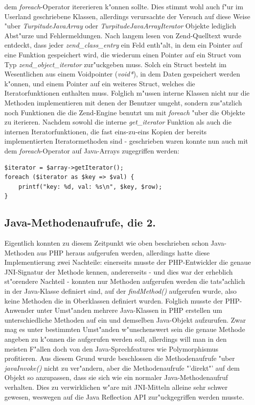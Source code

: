 dem \emph{foreach}-Operator itererieren k"onnen sollte. Dies stimmt wohl auch f"ur im Userland geschriebene Klassen, allerdings verursachte der Versuch auf diese Weise
"uber \emph{TurpitudeJavaArray} oder \emph{TurpitudeJavaArrayIterator} Objekte lediglich Abst"urze und Fehlermeldungen. Nach langem lesen von Zend-Quelltext
wurde entdeckt, dass jeder \emph{zend\_class\_entry} ein Feld enth"alt, in dem ein Pointer auf eine Funktion gespeichert wird, die wiederum einen Pointer auf ein Struct vom Typ
\emph{zend\_object\_iterator} zur"uckgeben muss. Solch ein Struct besteht im Wesentlichen aus einem Voidpointer (\emph{void*}), in dem Daten gespeichert werden k"onnen, und
einem Pointer auf ein weiteres Struct, welches die Iteratorfunktionen enthalten muss. Folglich m"ussen interne Klassen nicht nur die Methoden implementieren mit denen der
Benutzer umgeht, sondern zus"atzlich noch Funktionen die die Zend-Engine benutzt um mit \emph{foreach} "uber die Objekte zu iterieren. Nachdem sowohl die interne
\emph{get\_iterator} Funktion als auch die internen Iteratorfunktionen, die fast eins-zu-eins Kopien der bereits implementierten Iteratormethoden sind - geschrieben waren
konnte nun auch mit dem \emph{foreach}-Operator auf Java-Arrays zugegriffen werden:
\begin{lstlisting}[caption=Java-Array und foreach]
$iterator = $array->getIterator();
foreach ($iterator as $key => $val) {
    printf("key: %d, val: %s\n", $key, $row);
}
\end{lstlisting}

\subsection{Java-Methodenaufrufe, die 2.}
\label{sec:chap1:impl:12}

Eigentlich konnten zu diesem Zeitpunkt wie oben beschrieben schon Java-Methoden aus PHP heraus aufgerufen werden, allerdings hatte
diese Implementierung zwei Nachteile: einerseits musste der PHP-Entwickler die genaue JNI-Signatur der Methode kennen, andererseits -
und dies war der erheblich st"orendere Nachteil - konnten nur Methoden aufgerufen werden die tats"achlich in der Java-Klasse definiert
sind, auf der \emph{findMethod()} aufgerufen wurde, also keine Methoden die in Oberklassen definiert wurden. Folglich musste der
PHP-Anwender unter Umst"anden mehrere Java-Klassen in PHP erstellen um unterschiedliche Methoden auf ein und demselben Java-Objekt
aufzurufen. Zwar mag es unter bestimmten Umst"anden w"unschenswert sein die genaue Methode angeben zu k"onnen die aufgerufen werden
soll, allerdings will man in den meisten F"allen doch von den Java-Sprechfeatures wie Polymorphismus profitieren. Aus diesem Grund
wurde beschlossen die Methodenaufrufe "uber \emph{javaInvoke()} nicht zu ver"andern, aber die Methodenaufrufe "'direkt"' auf dem Objekt
so anzupassen, dass sie sich wie ein normaler Java-Methodenaufruf verhalten. Dies zu verwirklichen w"are mit JNI-Mitteln alleine
sehr schwer gewesen, weswegen auf die Java Reflection API zur"uckgegriffen werden musste.

